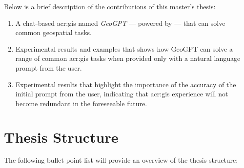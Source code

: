 Below is a brief description of the contributions of this master's thesis:

\begin{enumerate}
    \item A chat-based \acrshort{acr:gis} named \textit{GeoGPT} --- powered by  --- that can solve common geospatial tasks.
    \item Experimental results and examples that shows how GeoGPT can solve a range of common \acrshort{acr:gis} tasks when provided only with a natural language prompt from the user.
    \item Experimental results that highlight the importance of the accuracy of the initial prompt from the user, indicating that \acrshort{acr:gis} experience will not become redundant in the foreseeable future.
\end{enumerate}

\section{Thesis Structure}
\label{sec:thesis-structure}

\begin{comment}
This section provides the reader with an overview of what is coming in the next chapters.
You want to say more than what is explicit in the chapter name, if possible, but still keep the description short and to the point. So something along the lines of:

\begin{itemize}
    \item Chapter~\ref{cha:background_theory} introduces the theory, tools and methods necessary to understand the work.
    \item \textit{Lorem ipsum dolor sit amet, consectetur adipiscing elit.}
    \item Chapter~\ref{cha:conclusion} sums up the work and points to ways it can be improved or extended in the future.
\end{itemize}
\end{comment}

The following bullet point list will provide an overview of the thesis structure:

